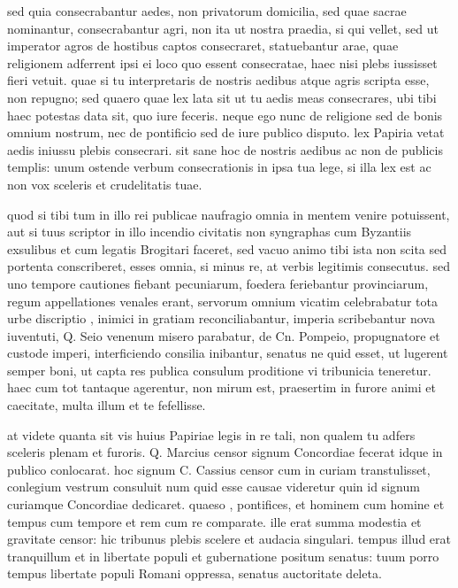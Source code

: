  sed quia consecrabantur aedes, non privatorum domicilia, sed quae sacrae nominantur, consecrabantur agri, non ita ut nostra praedia, si qui vellet, sed ut imperator agros de hostibus captos consecraret, statuebantur arae, quae religionem adferrent ipsi ei loco quo essent consecratae, haec nisi plebs iussisset fieri vetuit. quae si tu interpretaris de nostris aedibus atque agris scripta esse, non repugno; sed quaero quae lex lata sit ut tu aedis meas consecrares, ubi tibi haec potestas data sit, quo iure feceris. neque ego nunc de religione sed de bonis omnium nostrum, nec de pontificio sed de iure publico disputo. lex Papiria vetat aedis iniussu plebis consecrari. sit sane hoc de nostris aedibus ac non de publicis templis: unum ostende verbum consecrationis in ipsa tua lege, si illa lex est ac non vox sceleris et crudelitatis tuae.

 quod si tibi tum in illo rei publicae naufragio omnia in mentem venire potuissent, aut si tuus scriptor in illo incendio civitatis non syngraphas cum Byzantiis exsulibus et cum legatis Brogitari faceret, sed vacuo animo tibi ista non scita sed portenta conscriberet, esses omnia, si minus re, at verbis legitimis consecutus. sed uno tempore cautiones fiebant pecuniarum, foedera feriebantur provinciarum, regum appellationes venales erant, servorum omnium vicatim celebrabatur tota urbe discriptio , inimici in gratiam reconciliabantur, imperia scribebantur nova iuventuti, Q. Seio venenum misero parabatur, de Cn. Pompeio, propugnatore et custode imperi, interficiendo consilia inibantur, senatus ne quid esset, ut lugerent semper boni, ut capta res publica consulum proditione vi tribunicia teneretur. haec cum tot tantaque agerentur, non mirum est, praesertim in furore animi et caecitate, multa illum et te fefellisse.

 at videte quanta sit vis huius Papiriae legis in re tali, non qualem tu adfers sceleris plenam et furoris. Q. Marcius censor signum Concordiae fecerat idque in publico conlocarat. hoc signum C. Cassius censor cum in curiam transtulisset, conlegium vestrum consuluit num quid esse causae videretur quin id signum curiamque Concordiae dedicaret. quaeso , pontifices, et hominem cum homine et tempus cum tempore et rem cum re comparate. ille erat summa modestia et gravitate censor: hic tribunus plebis scelere et audacia singulari. tempus illud erat tranquillum et in libertate populi et gubernatione positum senatus: tuum porro tempus libertate populi Romani oppressa, senatus auctoritate deleta.

